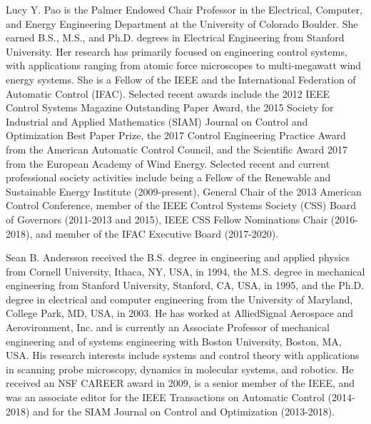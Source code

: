 \documentclass[journal]{IEEEtran}
\begin{document}
{\begin{IEEEbiography}
  {Lucy Y. Pao} 
  is the Palmer Endowed Chair Professor in the Electrical, Computer, and Energy Engineering Department at the University of Colorado Boulder. She earned B.S., M.S., and Ph.D. degrees in Electrical Engineering from Stanford University. Her research has primarily focused on engineering control systems, with applications ranging from atomic force microscopes to multi-megawatt wind energy systems. She is a Fellow of the IEEE and the International Federation of Automatic Control (IFAC). Selected recent awards include the 2012 IEEE Control Systems Magazine Outstanding Paper Award, the 2015 Society for Industrial and Applied Mathematics (SIAM) Journal on Control and Optimization Best Paper Prize, the 2017 Control Engineering Practice Award from the American Automatic Control Council, and the Scientific Award 2017 from the European Academy of Wind Energy. Selected recent and current professional society activities include being a Fellow of the Renewable and Sustainable Energy Institute (2009-present), 
  General Chair of the 2013 American Control Conference, member of the IEEE Control Systems Society (CSS) Board of Governors (2011-2013 and 2015), IEEE CSS Fellow Nominations Chair (2016-2018), and member of the IFAC Executive Board (2017-2020).    
\end{IEEEbiography}\vspace{-2em}
\begin{IEEEbiography}
  {Sean B. Andersson}
received the B.S. degree in engineering and applied physics from Cornell University, Ithaca, NY, USA, in 1994, the M.S. degree in mechanical engineering from Stanford University, Stanford, CA, USA, in 1995, and the Ph.D. degree in electrical and computer engineering from the University of Maryland, College Park, MD, USA, in 2003. He has worked at AlliedSignal Aerospace and Aerovironment, Inc. and is currently an Associate Professor of mechanical engineering and of systems engineering with Boston University, Boston, MA, USA. His research interests include systems and control theory with applications in scanning probe microscopy, dynamics in molecular systems, and robotics. He received an NSF CAREER award in 2009, is a senior member of the IEEE, and was an associate editor for the IEEE Transactions on Automatic Control (2014-2018) and for the SIAM Journal on Control and Optimization (2013-2018).
\end{IEEEbiography}
}


\end{document}
